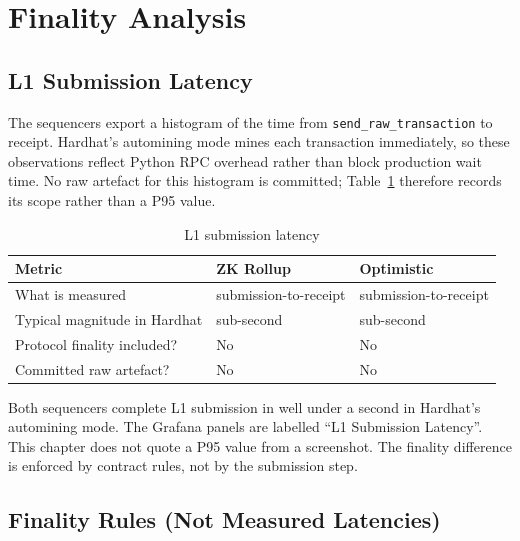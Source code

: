 \section{Finality Analysis}

\subsection{L1 Submission Latency}

The sequencers export a histogram of the time from \texttt{send\_raw\_transaction} to receipt. Hardhat's automining mode mines each transaction immediately, so these observations reflect Python RPC overhead rather than block production wait time. No raw artefact for this histogram is committed; Table~\ref{tab:l1-latency} therefore records its scope rather than a P95 value.

\begin{table}[htbp]
    \centering
    \small
    \setlength{\tabcolsep}{3pt}
    \renewcommand{\arraystretch}{1.05}
    \begin{tabular}{@{}>{\raggedright\arraybackslash}p{5.2cm}|>{\centering\arraybackslash}p{3.8cm}|>{\centering\arraybackslash}p{3.8cm}@{}}
        \hline
        \textbf{Metric} & \textbf{ZK Rollup} & \textbf{Optimistic} \\
        \hline
        What is measured & submission-to-receipt & submission-to-receipt \\
        \hline
        Typical magnitude in Hardhat & sub-second & sub-second \\
        \hline
        Protocol finality included? & No & No \\
        \hline
        Committed raw artefact? & No & No \\
        \hline
    \end{tabular}
    \caption{L1 submission latency}
    \label{tab:l1-latency}
\end{table}

Both sequencers complete L1 submission in well under a second in Hardhat's automining mode. The Grafana panels are labelled ``L1 Submission Latency''. This chapter does not quote a P95 value from a screenshot. The finality difference is enforced by contract rules, not by the submission step.

\subsection{Finality Rules (Not Measured Latencies)}

